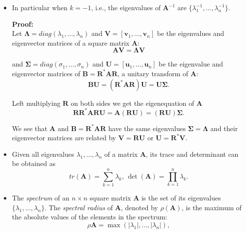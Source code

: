 \documentclass[10pt,b5paper,titlepage]{book}
\begin{document}
\begin{itemize}
\item In particular when $k = -1$, i.e., the eigenvalues of $\mathbf{A}^{-1}$ are $\{\lambda_{1}^{-1},\dots,\lambda_{n}^{-1}\}$.

\textbf{Proof:}\\
Let $\mathbf{\Lambda} = \mathit{diag}(\lambda_{1},\dots,\lambda_{n})$ and $\mathbf{V} = [\mathbf{v}_{1},\dots,\mathbf{v}_{n}]$ be the eigenvalues and eigenvector matrices of a square matrix $\mathbf{A}$:
\begin{equation}
\mathbf{A}\mathbf{V} = \mathbf{\Lambda}\mathbf{V}
\end{equation}

and $\mathbf{\Sigma} = \mathit{diag}(\sigma_{1},\dots,\sigma_{n})$ and $\mathbf{U} = [\mathbf{u}_{1},\dots,\mathbf{u}_{n}]$ be the eigenvalue and eigenvector matrices of $\mathbf{B} = \mathbf{R}^{*}\mathbf{A}\mathbf{R}$, a unitary transform of $\mathbf{A}$:
\begin{equation}
\mathbf{B}\mathbf{U} = (\mathbf{R}^{*}\mathbf{A}\mathbf{R})\mathbf{U} = \mathbf{U}\mathbf{\Sigma}
.\end{equation}

Left multiplying $\mathbf{R}$ on both sides we get the eigenequation of $\mathbf{A}$
\begin{equation}
\mathbf{R}\mathbf{R}^{*}\mathbf{A}\mathbf{R}\mathbf{U} = \mathbf{A}(\mathbf{R}\mathbf{U}) = (\mathbf{R}\mathbf{U})\mathbf{\Sigma}
.\end{equation}

We see that $\mathbf{A}$ and $\mathbf{B} = \mathbf{R}^{*}\mathbf{A}\mathbf{R}$ have the same eigenvalues $\mathbf{\Sigma} = \mathbf{\Lambda}$ and their eigenvector matrices are related by $\mathbf{V} = \mathbf{R}\mathbf{U}$ or $\mathbf{U} = \mathbf{R}^{*}\mathbf{V}$.

\item Given all eigenvalues $\lambda_{1},\dots,\lambda_{n}$ of a matrix $\mathbf{A}$, its trace and determinant can be obtained as
\begin{equation}
\mathit{tr}(\mathbf{A}) = \sum_{k=1}^{n}{\lambda_{k}}
\text{, }
\det(\mathbf{A}) = \prod_{k=1}^{n}{\lambda_{k}}
.\end{equation}

\item The \textit{spectrum} of an $n \times n$ square matrix $\mathbf{A}$ is the set of its eigenvalues $\{\lambda_{1},\dots,\lambda_{n}\}$. The \textit{spectral radius} of $\mathbf{A}$, denoted by $\rho(\mathbf{A})$, is the maximum of the absolute values of the elements in the spectrum:
\begin{equation}
\rho\mathbf{A} = \max{(|\lambda_{1}|,\dots,|\lambda_{n}|)}
,\end{equation}


\end{itemize}
\end{document}
